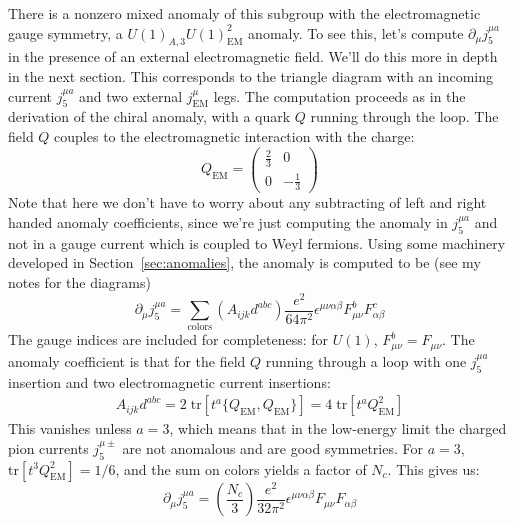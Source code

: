 \documentclass[11pt, oneside]{article}   	%
\theoremstyle{definition}
\numberwithin{equation}{subsection}		%
\begin{document}
There is a nonzero mixed anomaly of this subgroup with the electromagnetic gauge symmetry, a $U(1)_{A, 3} U(1)_\mathrm{EM}^2$ 
anomaly. To see this, let's compute $\partial_\mu j_5^{\mu a}$ in the presence of an external electromagnetic field. We'll do this more 
in depth in the next section. This corresponds to the triangle diagram with an incoming current $j_5^{\mu a}$ and two external 
$j_\mathrm{EM}^\mu$ legs. The computation proceeds as in the derivation of the chiral anomaly, with a quark $Q$ running through the 
loop. The field $Q$ couples to the electromagnetic interaction with the charge:
\begin{equation}
	Q_\mathrm{EM} = \begin{pmatrix} \frac{2}{3} & 0 \\ 0 & -\frac{1}{3} \end{pmatrix}
\end{equation}
Note that here we don't have to worry about any subtracting of left and right handed anomaly coefficients, since we're just computing the 
anomaly in $j_5^{\mu a}$ and not in a gauge current which is coupled to Weyl fermions. Using some machinery developed in 
Section~\ref{sec:anomalies}, the anomaly is computed to be (see my notes for the diagrams)
\begin{equation}
	\partial_\mu j_5^{\mu a} = \sum_\mathrm{colors}\left(A_{ijk}d^{abc}\right)\frac{e^2}{64\pi^2}\epsilon^{\mu\nu\alpha\beta} 
	F_{\mu\nu}^b F_{\alpha\beta}^c
\end{equation}
The gauge indices are included for completeness: for $U(1)$, $F_{\mu\nu}^b = F_{\mu\nu}$. The anomaly coefficient is that for the field $Q$ 
running through a loop with one $j_5^{\mu a}$ insertion and two electromagnetic current insertions:
\begin{align}
	A_{ijk} d^{abc} = 2 \;\mathrm{tr}\left[ t^a \{Q_\mathrm{EM}, Q_\mathrm{EM}\} \right] = 4\;\mathrm{tr}[t^a Q_\mathrm{EM}^2]
\end{align}
This vanishes unless $a = 3$, which means that in the low-energy limit the charged pion currents $j_5^{\mu\pm}$ are not anomalous 
and are good symmetries. For $a = 3$, $\mathrm{tr}[t^3 Q_\mathrm{EM}^2] = 1 / 6$, and the sum on colors yields a factor of $N_c$. This 
gives us:
\begin{equation}
	\partial_\mu j_5^{\mu a} = \left(\frac{N_c}{3}\right)\frac{e^2}{32\pi^2} \epsilon^{\mu\nu\alpha\beta} F_{\mu\nu} F_{\alpha\beta}
\end{equation}
\end{document}
